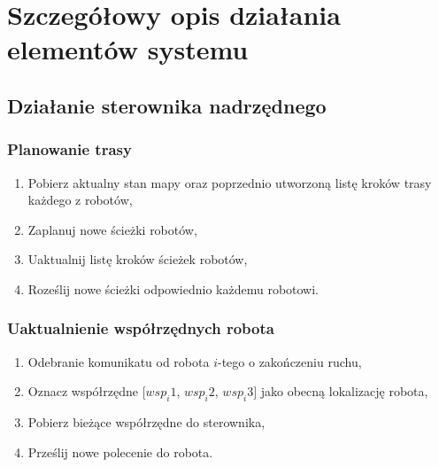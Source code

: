 \section{Szczegółowy opis działania elementów systemu}
\subsection{Działanie sterownika nadrzędnego}

\subsubsection*{Planowanie trasy}
\begin{enumerate}
    \item Pobierz aktualny stan mapy oraz poprzednio utworzoną listę kroków trasy każdego z robotów,
    \item Zaplanuj nowe ścieżki robotów,
    \item Uaktualnij listę kroków ścieżek robotów,
    \item Roześlij nowe ścieżki odpowiednio każdemu robotowi.
\end{enumerate}

\subsubsection*{Uaktualnienie współrzędnych robota}
\begin{enumerate}
    \item Odebranie komunikatu od robota $i$-tego o zakończeniu ruchu,
    \item Oznacz współrzędne $[wsp_i1$, $wsp_i2$, $wsp_i3]$ jako obecną lokalizację robota,
    \item Pobierz bieżące współrzędne do sterownika,
    \item Prześlij nowe polecenie do robota.
\end{enumerate}


